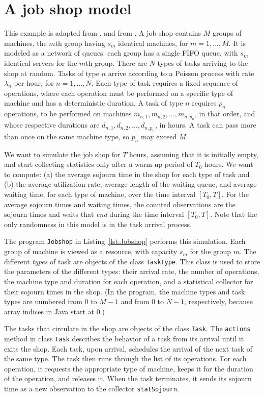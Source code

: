 \section {A job shop model}
\label {sec:jobshop}

This example is adapted from \cite[Section 2.6]{sLAW00a},
and from \cite{sLEC88a}.
A job shop contains $M$ groups of machines, the $m$th group having 
$s_m$ identical machines, for $m=1,\dots,M$.  
It is modeled as a network of queues:
each group has a single FIFO queue, with $s_m$ identical servers for the
$m$th group.  There are $N$ types of tasks arriving to the shop
at random.  Tasks of type $n$ arrive according to a Poisson process
with rate $\lambda_n$ per hour, for $n=1,\dots,N$.
Each type of task requires a fixed sequence of operations,
where each operation must be performed on a specific type of machine
and has a deterministic duration.
A task of type $n$ requires $p_n$ operations, to be performed on
machines $m_{n,1},m_{n,2},\dots,m_{n,p_n}$, in that order, and whose
respective durations are $d_{n,1},d_{n,2},\dots,d_{n,p_n}$, in hours.
A task can pass more than once on the same machine type, so $p_n$ may
exceed $M$.

We want to simulate the job shop for $T$ hours,
assuming that it is initially empty, and start collecting statistics
only after a warm-up period of $T_0$ hours.
We want to compute: (a) the average sojourn time in the shop for
each type of task and 
(b) the average utilization rate, average length of the waiting
queue, and average waiting time, for each type of machine,
over the time interval $[T_0,T]$.
For the average sojourn times and waiting times, the counted
observations are the sojourn times and waits that {\em end\/} during
the time interval $[T_0,T]$.
Note that the only randomness in this model is in the task
arrival process.

The program \texttt{Jobshop} in Listing~\ref{lst:Jobshop} performs this
simulation.  Each group of machine is viewed as a resource, with
capacity $s_m$ for the group $m$.
The different {\em types\/} of task are objects of the class \texttt{TaskType}.
This class is used to store the parameters of the different types:
their arrival rate, the number of operations, the machine type 
and duration for each operation, and a statistical collector for
their sojourn times in the shop.
(In the program, the machine types and task types are numbered
from 0 to $M-1$ and from 0 to $N-1$, respectively,
because array indices in Java start at 0.)

The tasks that circulate in the shop are objects of the class \texttt{Task}.
The \texttt{actions} method in class \texttt{Task} describes the behavior
of a task from its arrival until it exits the shop.
Each task, upon arrival, schedules the arrival of the next task of the
same type.  The task then runs through the list of its operations.
For each operation, it requests the appropriate type of machine,
keeps it for the duration of the operation, and releases it.
When the task terminates, it sends its sojourn time as a new observation
to the collector \texttt{statSojourn}.

